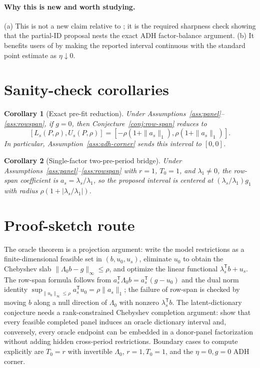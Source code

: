 \documentclass[11pt]{article}
\newcommand{\transpose}{\mathsf{T}}
\theoremstyle{definition}
\theoremstyle{plain}
\newtheorem{corollary}{Corollary}
\theoremstyle{remark}
\begin{document}
\paragraph{Why this is new and worth studying.}
(a) This is not a new claim relative to \citet{AbadieDiamondHainmueller2010}; it is the required sharpness check showing that the partial-ID proposal nests the exact ADH factor-balance argument. (b) It benefits users of \citet{AbadieDiamondHainmueller2010} by making the reported interval continuous with the standard point estimate as \(\eta\downarrow0\).

\section{Sanity-check corollaries}
\begin{corollary}[Exact pre-fit reduction]\label{cor:exact-prefit}
Under Assumptions~\ref{ass:panel}--\ref{ass:rowspan}, if \(g=0\), then Conjecture~\ref{conj:row-span} reduces to
\[
[L_s(P,\rho),U_s(P,\rho)]
=[-\rho(1+\|a_s\|_1),\rho(1+\|a_s\|_1)].
\]
In particular, Assumption~\ref{ass:adh-corner} sends this interval to \([0,0]\).
\end{corollary}

\begin{corollary}[Single-factor two-pre-period bridge]\label{cor:single-factor}
Under Assumptions~\ref{ass:panel}--\ref{ass:rowspan} with \(r=1\), \(T_0=1\), and \(\lambda_1\ne0\), the row-span coefficient is \(a_s=\lambda_s/\lambda_1\), so the proposed interval is centered at \((\lambda_s/\lambda_1)g_1\) with radius \(\rho(1+|\lambda_s/\lambda_1|)\).
\end{corollary}

\section{Proof-sketch route}
The oracle theorem is a projection argument: write the model restrictions as a finite-dimensional feasible set in \((b,u_0,u_s)\), eliminate \(u_0\) to obtain the Chebyshev slab \(\|\Lambda_0b-g\|_\infty\le\rho\), and optimize the linear functional \(\lambda_s^\transpose b+u_s\). The row-span formula follows from \(a_s^\transpose\Lambda_0b=a_s^\transpose(g-u_0)\) and the dual norm identity \(\sup_{\|u_0\|_\infty\le\rho}a_s^\transpose u_0=\rho\|a_s\|_1\); the failure of row-span is checked by moving \(b\) along a null direction of \(\Lambda_0\) with nonzero \(\lambda_s^\transpose b\). The latent-dictionary conjecture needs a rank-constrained Chebyshev completion argument: show that every feasible completed panel induces an oracle dictionary interval and, conversely, every oracle endpoint can be embedded in a donor-panel factorization without adding hidden cross-period restrictions. Boundary cases to compute explicitly are \(T_0=r\) with invertible \(\Lambda_0\), \(r=1,T_0=1\), and the \(\eta=0,g=0\) ADH corner.
\end{document}
